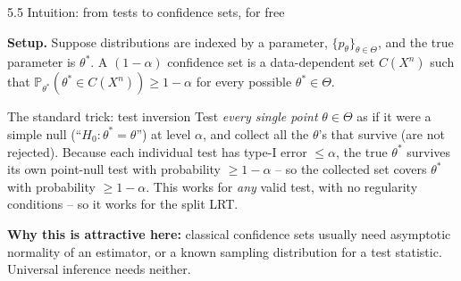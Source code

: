 \documentclass[aspectratio=169,10pt]{beamer}
\renewcommand{\P}{\mathbb{P}}
\begin{document}
\begin{frame}{5.5 Intuition: from tests to confidence sets, for free}

  \textbf{Setup.} Suppose distributions are indexed by a parameter,
  $\{p_\theta\}_{\theta\in\Theta}$, and the true parameter is
  $\theta^*$. A $(1-\alpha)$ confidence set is a data-dependent set
  $C(X^n)$ such that $\P_{\theta^*}(\theta^* \in C(X^n)) \ge 1-\alpha$
  for every possible $\theta^* \in \Theta$.

  \begin{block}{The standard trick: test inversion}
    Test \emph{every single point} $\theta \in \Theta$ as if it were a
    simple null (``$H_0: \theta^*=\theta$'') at level $\alpha$, and
    collect all the $\theta$'s that survive (are not rejected). Because
    each individual test has type-I error $\le \alpha$, the true
    $\theta^*$ survives its own point-null test with probability
    $\ge 1-\alpha$ -- so the collected set covers $\theta^*$ with
    probability $\ge 1-\alpha$. This works for \emph{any} valid test,
    with no regularity conditions -- so it works for the split LRT.
  \end{block}

  \textbf{Why this is attractive here:} classical confidence sets
  usually need asymptotic normality of an estimator, or a known
  sampling distribution for a test statistic. Universal inference
  needs neither.

\end{frame}
\end{document}
